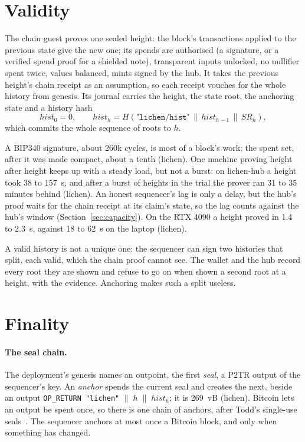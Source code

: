\documentclass[11pt]{article}
\newcommand{\tx}[1]{\texttt{#1}}
\begin{document}
\section{Validity}
\label{sec:validity}

The chain guest proves one sealed height: the block's transactions
applied to the previous state give the new one; its spends are
authorised (a signature, or a verified spend proof for a shielded
note), transparent inputs unlocked, no nullifier spent twice, values
balanced, mints signed by the hub. It takes the previous height's chain
receipt as an assumption, so each receipt vouches for the whole history
from genesis. Its journal carries the height, the state root, the
anchoring state and a history hash
\[
  \mathit{hist}_0 = 0, \qquad
  \mathit{hist}_h = H(\texttt{"lichen/hist"} \,\|\, \mathit{hist}_{h-1} \,\|\, \mathit{SR}_h),
\]
which commits the whole sequence of roots to $h$.

A BIP340 signature, about 260k cycles, is most of a block's work; the
spent set, after it was made compact, about a tenth (lichen). One
machine proving height after height keeps up with a steady load, but
not a burst: on lichen-hub a height took 38 to 157~s, and after a burst
of heights in the trial the prover ran 31 to 35 minutes behind
(lichen). An honest sequencer's lag is only a delay, but the hub's proof
waits for the chain receipt at its claim's state, so the lag counts
against the hub's window (Section~\ref{sec:capacity}). On the RTX 4090 a
height proved in 1.4 to 2.3~s, against 18 to 62~s on the laptop
(lichen).

A valid history is not a unique one: the sequencer can sign two
histories that split, each valid, which the chain proof cannot see. The
wallet and the hub record every root they are shown and refuse to go on
when shown a second root at a height, with the evidence. Anchoring makes
such a split useless.

\section{Finality}
\label{sec:finality}

\paragraph{The seal chain.} The deployment's genesis names an outpoint,
the first \emph{seal}, a P2TR output of the sequencer's key. An
\emph{anchor} spends the current seal and creates the next, beside an
output \tx{OP\_RETURN "lichen"} $\|\; h \;\|\; \mathit{hist}_h$; it is
269~vB (lichen). Bitcoin lets an output be spent once, so there is one
chain of anchors, after Todd's single-use seals~\cite{toddseals}. The
sequencer anchors at most once a Bitcoin block, and only when something
has changed.
\end{document}

